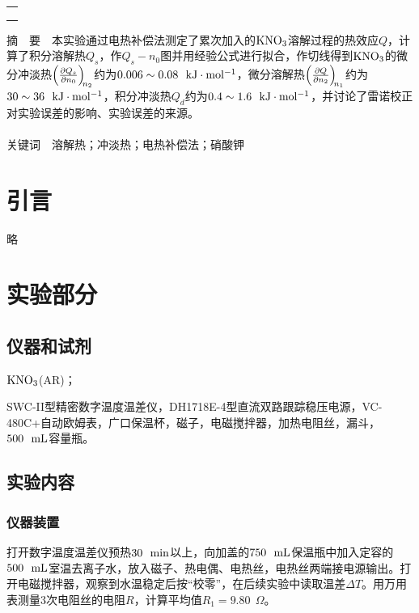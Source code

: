 \documentclass[12pt]{article}
\begin{document}
\begin{titlepage}
\begin{center}
            \begin{tabular*}{\textwidth}{c}
                \\ %
                \\ %
                \\ %
                \\ %
                \hline %
            \end{tabular*}
        \end{center}
        \textsf{摘\ \ 要}\ \ 本实验通过电热补偿法测定了累次加入的$\rm KNO_{3}$溶解过程的热效应$Q$，计算了积分溶解热$Q_{s}$，作$Q_{s}-n_{0}$图并用经验公式进行拟合，作切线得到$\rm KNO_{3}$的微分冲淡热$\diffp  {Q_{s}}{n_{0}}[n_{2}]$约为$0.006\sim 0.08\ \ {\rm kJ\cdot mol^{-1}}$，微分溶解热$\diffp  {Q}{n_{2}}[n_{1}]$约为$30\sim 36\ \ {\rm kJ\cdot mol^{-1}}$，积分冲淡热$Q_{d}$约为$0.4\sim 1.6\ \ {\rm kJ\cdot mol^{-1}}$，并讨论了雷诺校正对实验误差的影响、实验误差的来源。
        \\
        \\
        \textsf{关键词}\ \ 溶解热；冲淡热；电热补偿法；硝酸钾
    \end{titlepage}

    \section{引言}
	略
               
\vbox{}        
    \section{实验部分}
    	\subsection{仪器和试剂}
    	$\rm KNO_{3}$(AR)；\par 
    	SWC-II型精密数字温度温差仪，DH1718E-4型直流双路跟踪稳压电源，VC-480C+自动欧姆表，广口保温杯，磁子，电磁搅拌器，加热电阻丝，漏斗，$500\ \ {\rm mL}$容量瓶。
     
\vbox{}
    	 \subsection{实验内容\citealp{physchemlab}}
			\subsubsection{仪器装置}
			打开数字温度温差仪预热$30\ \ {\rm min}$以上，向加盖的$750\ \ {\rm mL}$保温瓶中加入定容的$500\ \ {\rm mL}$室温去离子水，放入磁子、热电偶、电热丝，电热丝两端接电源输出。打开电磁搅拌器，观察到水温稳定后按“校零”，在后续实验中读取温差$\Delta T$。用万用表测量3次电阻丝的电阻$R$，计算平均值$R_{1}=9.80\ \ \Omega$。
		
\end{document}
